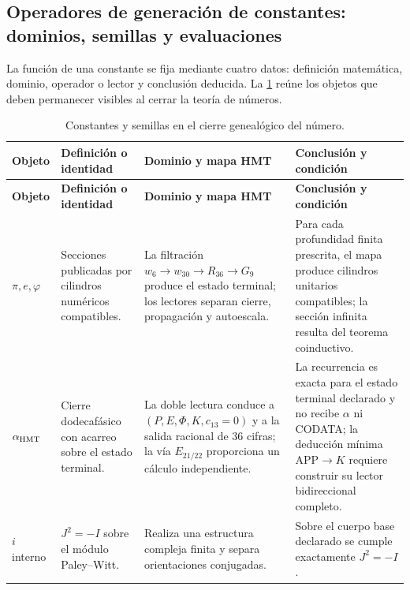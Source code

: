 \subsection{Operadores de generación de constantes: dominios, semillas y evaluaciones}

La función de una constante se fija mediante cuatro datos: definición
matemática, dominio, operador o lector y conclusión deducida. La
\cref{p3-83-c44-s2:tab:semillas-cierre-genealogico-numero} reúne los objetos que deben
permanecer visibles al cerrar la teoría de números.

\begingroup
\small
\setlength{\LTpre}{0.5\baselineskip}
\setlength{\LTpost}{0.5\baselineskip}
\begin{longtable}{@{}>{\raggedright\arraybackslash}p{}
                    >{\raggedright\arraybackslash}p{}
                    >{\raggedright\arraybackslash}p{}
                    >{\raggedright\arraybackslash}p{}@{}}
\caption{Constantes y semillas en el cierre genealógico del número.}
\label{p3-83-c44-s2:tab:semillas-cierre-genealogico-numero}\\
\toprule
\textbf{Objeto} & \textbf{Definición o identidad} &
\textbf{Dominio y mapa HMT} & \textbf{Conclusión y condición}\\
\midrule
\endfirsthead
\toprule
\textbf{Objeto} & \textbf{Definición o identidad} &
\textbf{Dominio y mapa HMT} & \textbf{Conclusión y condición}\\
\midrule
\endhead
\(\pi,e,\varphi\) &
Secciones publicadas por cilindros numéricos compatibles. &
La filtración
\(w_6\to w_{30}\to R_{36}\to G_9\) produce el estado terminal; los lectores
separan cierre, propagación y autoescala. &
Para cada profundidad finita prescrita, el mapa produce cilindros unitarios
compatibles; la sección infinita resulta del teorema coinductivo.\\
\(\alpha_{\rm HMT}\) &
Cierre dodecafásico con acarreo sobre el estado terminal. &
La doble lectura conduce a
\((P,E,\Phi,K,c_{13}=0)\) y a la salida racional de \(36\) cifras; la vía
\(E_{21/22}\) proporciona un cálculo independiente. &
La recurrencia es exacta para el estado terminal declarado y no recibe
\(\alpha\) ni CODATA; la deducción mínima APP\(\to K\) requiere construir su
lector bidireccional completo.\\
\(i\) interno &
\(J^2=-I\) sobre el módulo Paley--Witt. &
Realiza una estructura compleja finita y separa orientaciones conjugadas. &
Sobre el cuerpo base declarado se cumple exactamente \(J^2=-I\).\\

\end{longtable}
